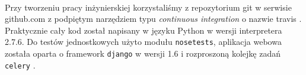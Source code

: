 \paragraph{} Przy tworzeniu pracy inżynierskiej korzystaliśmy z repozytorium git w serwisie github.com \cite{github} z podpiętym narzędziem typu \textit{continuous integration} o nazwie travis \cite{travis}. Praktycznie cały kod został napisany w języku Python w wersji interpretera 2.7.6. Do testów jednostkowych użyto modułu \verb#nosetests#, aplikacja webowa została oparta o framework \verb#django# w wersji 1.6 i rozproszoną kolejkę zadań \verb#celery# \cite{celery}.
\paragraph{} 